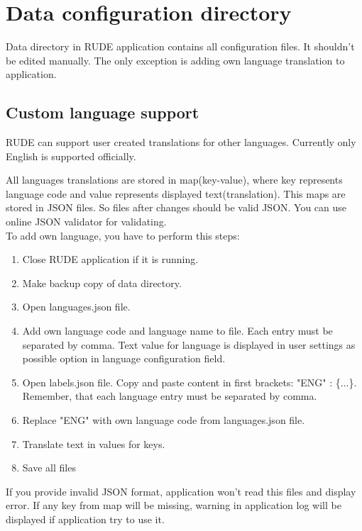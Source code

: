 \section{Data configuration directory}\label{section:data-config}

Data directory in RUDE application contains all configuration files. It shouldn't be edited manually. The only exception is adding own language translation to application.

\subsection{Custom language support}\label{sub:config-labels}

RUDE can support user created translations for other languages. Currently only English is supported officially.

All languages translations are stored in map(key-value), where key represents language code and value represents displayed text(translation). This maps are stored in JSON files. So files after changes should be valid JSON. You can use online JSON validator for validating.\\

To add own language, you have to perform this steps:
\begin{enumerate}
	\item Close RUDE application if it is running.
	\item Make backup copy of data directory.
	\item Open languages.json file.
	\item Add own language code and language name to file. Each entry must be separated by comma. Text value for language is displayed in user settings as possible option in language configuration field.
	\item Open labels.json file. Copy and paste content in first brackets: "ENG" : \{...\}. Remember, that each language entry must be separated by comma.
	\item Replace "ENG" with own language code from languages.json file.
	\item Translate text in values for keys.
	\item Save all files
\end{enumerate}


If you provide invalid JSON format, application won't read this files and display error. If any key from map will be missing, warning in application log will be displayed if application try to use it.

\vfill\newpage
